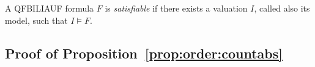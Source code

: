 \begin{mydef}
  A QFBILIAUF formula $F$ is \emph{satisfiable} if there exists a valuation $I$, called also its model, such that $I \models F$.
\end{mydef}

\subsection{Proof of Proposition~\ref{prop:order:countabs}}



